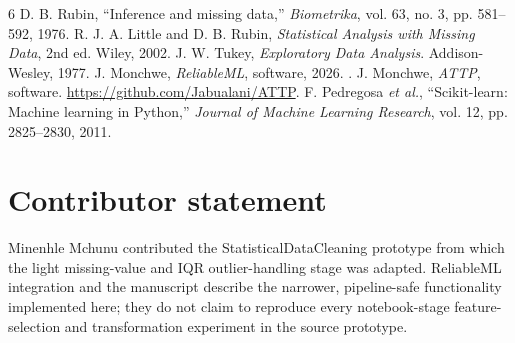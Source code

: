 \documentclass[conference]{IEEEtran}
\begin{document}
\begin{thebibliography}{6}
 D. B. Rubin, ``Inference and missing data,'' \emph{Biometrika}, vol. 63, no. 3, pp. 581--592, 1976.
 R. J. A. Little and D. B. Rubin, \emph{Statistical Analysis with Missing Data}, 2nd ed. Wiley, 2002.
 J. W. Tukey, \emph{Exploratory Data Analysis}. Addison-Wesley, 1977.
 J. Monchwe, \emph{ReliableML}, software, 2026. \projecturl.
 J. Monchwe, \emph{ATTP}, software. \url{https://github.com/Jabualani/ATTP}.
 F. Pedregosa \emph{et al.}, ``Scikit-learn: Machine learning in Python,'' \emph{Journal of Machine Learning Research}, vol. 12, pp. 2825--2830, 2011.
\end{thebibliography}

\section*{Contributor statement}
Minenhle Mchunu contributed the StatisticalDataCleaning prototype from which the light missing-value and IQR outlier-handling stage was adapted. ReliableML integration and the manuscript describe the narrower, pipeline-safe functionality implemented here; they do not claim to reproduce every notebook-stage feature-selection and transformation experiment in the source prototype.
\end{document}
